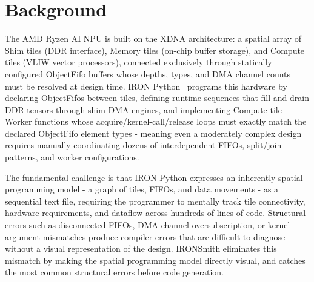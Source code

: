 \section{Background} \label{sec:background}
\vspace{-3mm}


The AMD Ryzen AI NPU is built on the XDNA architecture: a spatial array of Shim tiles (DDR interface), Memory tiles (on-chip buffer storage), and Compute tiles (VLIW vector processors), connected exclusively through statically configured ObjectFifo buffers whose depths, types, and DMA channel counts must be resolved at design time. IRON Python~\cite{iron2025} programs this hardware by declaring ObjectFifos between tiles, defining runtime sequences that fill and drain DDR tensors through shim DMA engines, and implementing Compute tile Worker functions whose acquire/kernel-call/release loops must exactly match the declared ObjectFifo element types - meaning even a moderately complex design requires manually coordinating dozens of interdependent FIFOs, split/join patterns, and worker configurations.

The fundamental challenge is that IRON Python expresses an inherently spatial programming model - a graph of tiles, FIFOs, and data movements - as a sequential text file, requiring the programmer to mentally track tile connectivity, hardware requirements, and dataflow across hundreds of lines of code. Structural errors such as disconnected FIFOs, DMA channel oversubscription, or kernel argument mismatches produce compiler errors that are difficult to diagnose without a visual representation of the design. IRONSmith eliminates this mismatch by making the spatial programming model directly visual, and catches the most common structural errors before code generation.

\vspace{-1mm}
